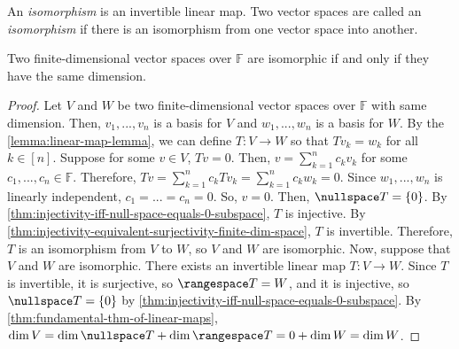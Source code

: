 \documentclass{article}
\begin{document}
\begin{definition}[isomorphism]
  \label{def:isomorphism}
  An \textit{isomorphism} is an invertible linear map. Two vector
  spaces are called an \textit{isomorphism} if there is an isomorphism
  from one vector space into another.
\end{definition}

\begin{theorem}
  \label{thm:dimension-shows-two-vector-spaces-isomorphic}
  Two finite-dimensional vector spaces over $\mathbb{F}$ are
  isomorphic if and only if they have the same dimension.
\end{theorem}
\begin{proof}
  Let $V$ and $W$ be two finite-dimensional vector spaces over
  $\mathbb{F}$ with same dimension. Then, $v_1, ..., v_n$ is a basis for $V$ and $w_1,
  ..., w_n$ is a basis for $W$. By the \cref{lemma:linear-map-lemma},
  we can define $T: V \rightarrow W$ so that $Tv_k = w_k$ for all $k
  \in [n]$. Suppose for some $v \in V$, $Tv = 0$. Then, $v =
  \sum_{k=1}^n c_kv_k$ for some $c_1, ..., c_n \in
  \mathbb{F}$. Therefore, $Tv = \sum_{k=1}^n c_k Tv_k = \sum_{k=1}^n
  c_k w_k = 0$. Since $w_1, ..., w_n$ is linearly independent, $c_1 =
  ... = c_n = 0$. So, $v = 0$. Then, $\nullspace T = \{0\}$. By
  \cref{thm:injectivity-iff-null-space-equals-0-subspace}, $T$ is
  injective. By
  \cref{thm:injectivity-equivalent-surjectivity-finite-dim-space}, $T$
  is invertible. Therefore, $T$ is an isomorphism from $V$ to $W$, so
  $V$ and $W$ are isomorphic. Now, suppose that $V$ and $W$ are
  isomorphic. There exists an invertible linear map $T: V \rightarrow
  W$. Since $T$ is invertible, it is surjective, so $\rangespace T =
  W$, and it is injective, so $\nullspace T = \{0\}$ by
  \cref{thm:injectivity-iff-null-space-equals-0-subspace}.
  By \cref{thm:fundamental-thm-of-linear-maps}, $\dim V = \dim
  \nullspace T + \dim \rangespace T = 0 + \dim W = \dim W$.
\end{proof}
\end{document}
